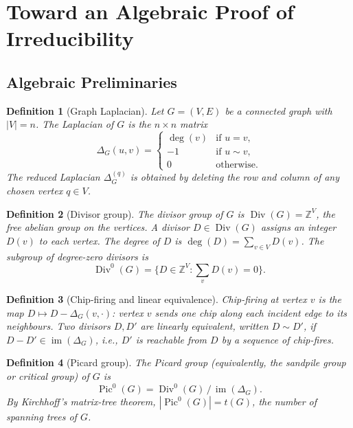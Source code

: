 \documentclass[11pt]{article}
\newtheorem{definition}{Definition}[section]
\newcommand{\Z}{\mathbb{Z}}
\newcommand{\Pic}{\operatorname{Pic}^0}
\newcommand{\Div}{\operatorname{Div}^0}
\newcommand{\im}{\operatorname{im}}
\begin{document}
\section{Toward an Algebraic Proof of Irreducibility}\label{sec:irreducibility}

\subsection{Algebraic Preliminaries}

\begin{definition}[Graph Laplacian]\label{def:laplacian}
Let $G = (V, E)$ be a connected graph with $|V| = n$. The \emph{Laplacian} of
$G$ is the $n \times n$ matrix
\[
  \Delta_G(u,v) =
  \begin{cases}
    \deg(v) & \text{if } u = v, \\
    -1      & \text{if } u \sim v, \\
    0       & \text{otherwise.}
  \end{cases}
\]
The \emph{reduced Laplacian} $\Delta_G^{(q)}$ is obtained by deleting the row
and column of any chosen vertex $q \in V$.
\end{definition}

\begin{definition}[Divisor group]\label{def:divisor}
The \emph{divisor group} of $G$ is $\operatorname{Div}(G) = \Z^V$, the free
abelian group on the vertices. A divisor $D \in \operatorname{Div}(G)$ assigns
an integer $D(v)$ to each vertex. The \emph{degree} of $D$ is
$\deg(D) = \sum_{v \in V} D(v)$. The subgroup of degree-zero divisors is
\[
  \Div(G) = \bigl\{D \in \Z^V : \textstyle\sum_v D(v) = 0\bigr\}.
\]
\end{definition}

\begin{definition}[Chip-firing and linear equivalence]\label{def:chipfire}
\emph{Chip-firing} at vertex $v$ is the map $D \mapsto D - \Delta_G(v, \cdot)$:
vertex $v$ sends one chip along each incident edge to its neighbours. Two
divisors $D, D'$ are \emph{linearly equivalent}, written $D \sim D'$, if
$D - D' \in \im(\Delta_G)$, i.e., $D'$ is reachable from $D$ by a sequence of
chip-fires.
\end{definition}

\begin{definition}[Picard group]\label{def:picard}
The \emph{Picard group} (equivalently, the \emph{sandpile group} or
\emph{critical group}) of $G$ is
\[
  \Pic(G) = \Div(G)\, /\, \im(\Delta_G).
\]
By Kirchhoff's matrix-tree theorem, $|\Pic(G)| = t(G)$, the number of spanning
trees of $G$.
\end{definition}
\end{document}
